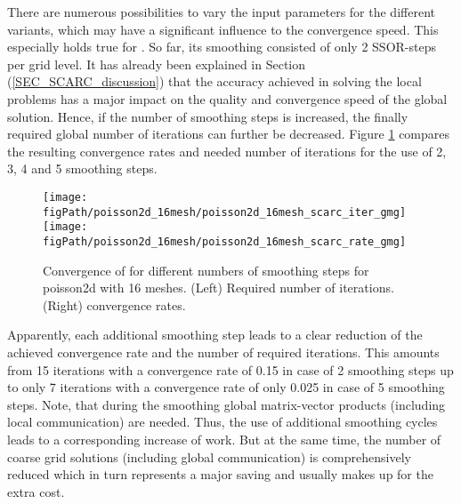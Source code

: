 There are numerous possibilities to vary the input parameters for the different \scarc{} variants, 
which may have a significant influence to the convergence speed. This especially holds true for \scarcmultigrid{}. 
So far, its smoothing consisted of only 2 SSOR-steps per grid level. 
It has already been explained in Section (\ref{SEC_SCARC_discussion}) that the accuracy achieved in solving the local problems has a major impact on the quality and convergence speed of the global solution. Hence, if the number of smoothing steps is increased, the finally required global number of \scarc{} iterations can further be decreased. Figure \ref{FIG_scarc_poisson_sixteen_multigrid} compares the resulting convergence rates and needed number of \scarc{} iterations for the use of 2, 3, 4 and 5 smoothing steps.

\begin{figure}[ht]
\begin{center}
\texttt{[image: \\figPath/poisson2d\_16mesh/poisson2d\_16mesh\_scarc\_iter\_gmg]}
\texttt{[image: \\figPath/poisson2d\_16mesh/poisson2d\_16mesh\_scarc\_rate\_gmg]}
\end{center}
\caption[Convergence of \scarcmultigrid{} for different numbers of smoothing steps for {\ct poisson2d} with 16 meshes]{Convergence of \scarcmultigrid{} for different numbers of smoothing steps 
for {\ct poisson2d} with 16 meshes.
(Left) Required number of \scarc{} iterations. (Right) \scarc{} convergence rates.}
\label{FIG_scarc_poisson_sixteen_multigrid}
\end{figure}

Apparently, each additional smoothing step leads to a clear reduction of the achieved convergence rate and the number of required \scarc{} iterations. This amounts from 15 \scarc{} iterations with a convergence rate of 0.15 in case of 2 smoothing steps up to only 7 \scarc{}  iterations with a convergence rate of only 0.025 in case of 5 smoothing steps.
Note, that during the smoothing global matrix-vector products (including local communication) are needed. Thus, the use of additional smoothing cycles leads to a corresponding increase of work. But at the same time, the number of coarse grid solutions (including global communication) is comprehensively reduced 
which in turn represents a major saving and usually makes up for the extra cost.

